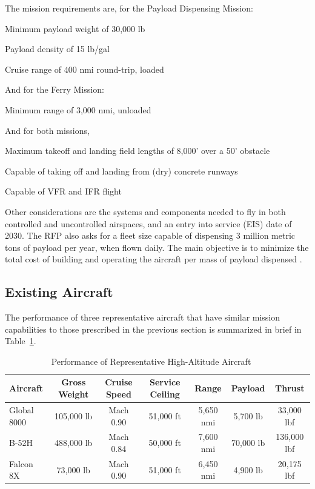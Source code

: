 \documentclass[12pt]{article}
\newcounter{enumine}
\begin{document}
The mission requirements are, for the Payload Dispensing Mission:
\begin{compactenum}
\setcounter{enumi}{\value{enumine}}
	\item Minimum payload weight of 30,000 lb
	\item Payload density of 15 lb/gal
	\item Cruise range of 400 nmi round-trip, loaded
\setcounter{enumine}{\value{enumi}}
\end{compactenum}

And for the Ferry Mission:
\begin{compactenum}
\setcounter{enumi}{\value{enumine}}
	\item Minimum range of 3,000 nmi, unloaded
\setcounter{enumine}{\value{enumi}}
\end{compactenum}

And for both missions,
\begin{compactenum}
\setcounter{enumi}{\value{enumine}}
	\item Maximum takeoff and landing field lengths of 8,000' over a 50' obstacle
	\item Capable of taking off and landing from (dry) concrete runways
	\item Capable of VFR and IFR flight
\end{compactenum}

Other considerations are the systems and components needed to fly in both controlled and uncontrolled airspaces, and an entry into service (EIS) date of 2030.
The RFP also asks for a fleet size capable of dispensing 3 million metric tons of payload per year, when flown daily.
The main objective is to minimize the total cost of building and operating the aircraft per mass of payload dispensed \cite{Bradley:2023aa}.


\subsection{Existing Aircraft}
The performance of three representative aircraft that have similar mission capabilities to those prescribed in the previous section is summarized in brief in Table~\ref{tab:exist}.
\begin{table}[h]
	\centering
	\begin{tabular}{@{}lcccccc@{}}
		\toprule
		Aircraft & Gross Weight & Cruise Speed & Service Ceiling & Range & Payload & Thrust \\
		\midrule
		Global 8000 & 105,000 lb & Mach 0.90 & 51,000 ft & 5,650 nmi & 5,700 lb & 33,000 lbf \\
		B-52H & 488,000 lb & Mach 0.84 & 50,000 ft & 7,600 nmi & 70,000 lb & 136,000 lbf \\
		Falcon 8X & 73,000 lb & Mach 0.90 & 51,000 ft & 6,450 nmi & 4,900 lb & 20,175 lbf \\
		\bottomrule
	\end{tabular}
	\caption{Performance of Representative High-Altitude Aircraft~\cite{Janes:2023ab}~\cite{Force:2019aa}~\cite{Janes:2023aa}}
	\label{tab:exist}
\end{table}
\end{document}
